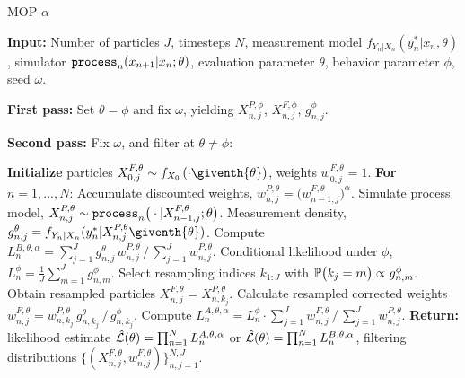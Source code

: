 \documentclass[11pt]{article}
\begin{document}
\begin{algorithm}[H]
	\caption{MOP-$\alpha$}
    \label{alg:mop}
	     \textbf{Input:} Number of particles $J$, timesteps $N$, measurement model $f_{Y_n|X_n}(y_n^*|x_n, \theta)$, simulator $\texttt{process}_n(x_{n+1}|x_n; \theta)$, evaluation parameter $\theta$, behavior parameter $\phi$, seed $\omega$.
      
        \textbf{First pass:} Set $\theta=\phi$ and fix $\omega$, yielding $X_{n,j}^{P,\phi}$, $X_{n,j}^{F,\phi}$, $g^{\phi}_{n,j}$.
            
        \textbf{Second pass:}
        Fix $\omega$, and filter at $\theta\neq \phi$:
            
		\textbf{Initialize } particles ${X}_{0,j}^{F,\theta}\sim {f}_{{X}_{0}}\left(\cdot\giventh{\theta}\right)$, weights $w^{F,\theta}_{0,j}= 1$. \newline
		\textbf{For} $n=1,...,N$: \newline
            \hspace*{4mm} Accumulate discounted weights, $w_{n,j}^{P,\theta} = \big(w_{n-1,j}^{F,\theta}\big)^\alpha$.\newline
            \hspace*{4mm} Simulate process model,
            ${X}_{n,j}^{P,\theta}\sim \texttt{process}_n\big(\cdot|{X}_{n-1,j}^{F, \theta};{\theta}\big)$. \newline
            \hspace*{4mm} Measurement density,
            $g^{\theta}_{n,j}={f}_{{Y}_{n}|{X}_{n}}(y_{n}^{*}|{X}_{n,j}^{P,\theta}\giventh{\theta})$. \newline
            \hspace*{4mm} Compute $L_n^{B,\theta,\alpha} ={\sum_{j=1}^Jg^\theta_{n,j} \, w^{P,\theta}_{n,j}}\, \big/\, {\sum_{j=1}^J  w^{P,\theta}_{n,j}}$. \newline
            \hspace*{4mm} Conditional likelihood under $\phi$,
            $L_n^{\phi} = \frac{1}{J}\sum_{m=1}^{J}g^{\phi}_{n,m}$.\newline
            \hspace*{4mm} Select resampling indices $k_{1:J}$ with $\mathbb{P}\big(k_{j}=m\big) \propto g^{\phi}_{n,m}$. \newline
            \hspace*{4mm} Obtain resampled particles ${X}_{n,j}^{F,\theta}={X}_{n,k_{j}}^{P,\theta}$. \newline
            \hspace*{4mm} Calculate resampled corrected weights
            $w_{n,j}^{F,\theta}= w^{P,\theta}_{n,k_j} \, g^{\theta}_{n,k_j} \, \big/ \, { g^{\phi}_{n,k_j}}$.\newline
            \hspace*{4mm} Compute $ L_n^{A,\theta,\alpha} = L_n^\phi\cdot {\sum_{j=1}^J w^{F,\theta}_{n,j}} \, \big/ \, {\sum_{j=1}^J  w^{P,\theta}_{n,j}}$.\newline
		\textbf{Return:} likelihood estimate $\hat{\mathcal{L}}(\theta) = \prod_{n=1}^N L_n^{A,\theta,\alpha}$ or $\hat{\mathcal{L}}(\theta) = \prod_{n=1}^N L_n^{B,\theta,\alpha}$, filtering distributions $\{(X_{n,j}^{F, \theta}, w^{F,\theta}_{n,j})\}_{n,j=1}^{N,J}.$
\end{algorithm}
\end{document}
